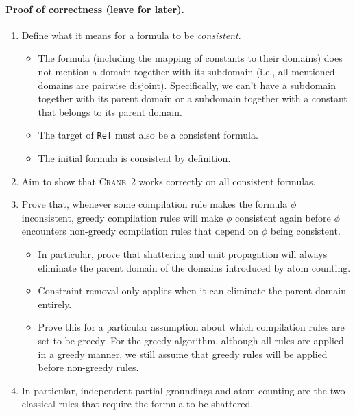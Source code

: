 \documentclass{article}
\theoremstyle{definition}
\newcommand{\Cranetwo}{\textsc{Crane}~2}
\begin{document}
\paragraph{Proof of correctness (leave for later).}
\begin{enumerate}
  \item Define what it means for a formula to be \emph{consistent}.
        \begin{itemize}
          \item The formula (including the mapping of constants to their
                domains) does not mention a domain together with its subdomain
                (i.e., all mentioned domains are pairwise disjoint).
                Specifically, we can't have a subdomain together with its parent
                domain or a subdomain together with a constant that belongs to
                its parent domain.
          \item The target of \texttt{Ref} must also be a consistent formula.
          \item The initial formula is consistent by definition.
        \end{itemize}
  \item Aim to show that \Cranetwo{} works correctly on all consistent formulas.
  \item Prove that, whenever some compilation rule makes the formula $\phi$
        inconsistent, greedy compilation rules will make $\phi$ consistent again
        before $\phi$ encounters non-greedy compilation rules that depend on
        $\phi$ being consistent.
        \begin{itemize}
          \item In particular, prove that shattering and unit propagation will
                always eliminate the parent domain of the domains introduced by
                atom counting.
          \item Constraint removal only applies when it can eliminate the parent
                domain entirely.
          \item Prove this for a particular assumption about which compilation
                rules are set to be greedy. For the greedy algorithm, although
                all rules are applied in a greedy manner, we still assume that
                greedy rules will be applied before non-greedy rules.
        \end{itemize}
  \item In particular, independent partial groundings and atom counting are the
        two classical rules that require the formula to be shattered.
  \end{enumerate}
\end{document}
